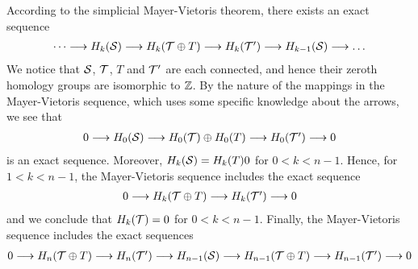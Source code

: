 \documentclass[a4paper]{amsart}
\begin{document}
\begin{remark}
    According to the simplicial Mayer-Vietoris theorem, there exists an exact sequence 
    \begin{align*}
        \begin{CD}
            \dots \longrightarrow H_{k}(\calS) \longrightarrow H_{k}(\calT \oplus T) \longrightarrow H_{k}(\calT') \longrightarrow H_{k-1}(\calS) \longrightarrow\dots 
        \end{CD}
    \end{align*}
    We notice that ${\mathcal S}$, ${\mathcal T}$, $T$ and ${\mathcal T}'$ are each connected, and hence their zeroth homology groups are isomorphic to ${\mathbb Z}$. 
    By the nature of the mappings in the Mayer-Vietoris sequence, 
    \color{red}which uses some specific knowledge about the arrows\color{black}, 
    we see that 
    \begin{align*}
        \begin{CD}
            0 \longrightarrow H_{0}(\calS) \longrightarrow H_{0}(\calT) \oplus H_{0}(T) \longrightarrow H_{0}(\calT') \longrightarrow 0 
        \end{CD}
    \end{align*}
    is an exact sequence. 
    Moreover, $H_{k}({\mathcal S}) = H_{k}(T) 0$ for $0 < k < n-1$. Hence, for $1 < k < n-1$,
    the Mayer-Vietoris sequence includes the exact sequence 
    \begin{align*}
        \begin{CD}
            0 \longrightarrow H_{k}(\calT \oplus T) \longrightarrow H_{k}(\calT') \longrightarrow 0 
        \end{CD}
    \end{align*}
    and we conclude that $H_{k}({\mathcal T}) = 0$ for $0 < k < n-1$.
    Finally, the Mayer-Vietoris sequence includes the exact sequences 
    \begin{align*}
        \begin{CD}
            0 \longrightarrow H_{n}(\calT \oplus T) \longrightarrow H_{n}(\calT') \longrightarrow H_{n-1}(\calS) \longrightarrow H_{n-1}(\calT \oplus T) \longrightarrow H_{n-1}(\calT') \longrightarrow 0 
        \end{CD}
    \end{align*}

\end{remark}
\end{document}
